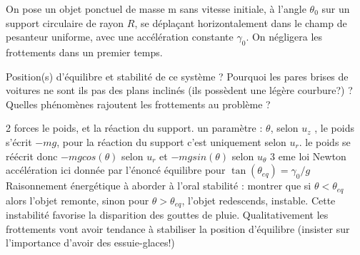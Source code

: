 \begin{Exercise}[title=Goutte de pluie et pare brise]
  On pose un objet ponctuel de masse m sans vitesse initiale, à l'angle
  $\theta_0$ sur un support circulaire de rayon $R$, se déplaçant horizontalement
  dans le champ de pesanteur uniforme, avec une accélération
  constante $\gamma_0$. On négligera les frottements dans un premier temps.
  \begin{center}
  \end{center}
  \Question Position(s) d'équilibre et stabilité de ce système ?
  \Question Pourquoi les pares brises de voitures ne sont ils pas des
  plans inclinés (ils possèdent une légère courbure?) ?
  \Question Quelles phénomènes rajoutent les frottements au problème ?

\end{Exercise}
\begin{Answer}
 2 forces le poids, et la réaction du support. un paramètre : $\theta$, selon $u_z$ ,
 le poids s'écrit $-mg$, pour la réaction du support c’est uniquement selon
 $u_r$.
  le poids se réécrit donc $-mg cos(\theta)$ selon $u_r$ et $-mg sin(\theta)$  selon $u_\theta$
 3 eme loi Newton accélération ici donnée par l'énoncé équilibre pour $\tan(\theta_{eq}) = \gamma_0/ g$
 Raisonnement énergétique à aborder à l'oral
 stabilité : montrer que si $\theta< \theta_{eq}$ alors l'objet remonte, sinon pour $\theta >
 \theta_{eq}$, l'objet redescends, instable.
 Cette instabilité favorise la disparition des gouttes de pluie.
 Qualitativement les frottements vont avoir tendance à stabiliser la position
 d'équilibre (insister sur l'importance d'avoir des essuie-glaces!)
\end{Answer}
